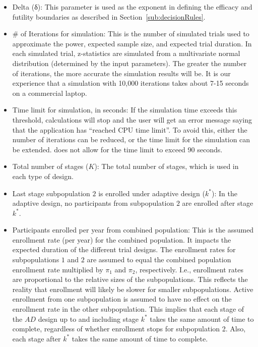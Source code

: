 \documentclass[article]{jss}
\begin{document}
\begin{itemize}

\item Delta (δ): This parameter is used as the exponent in defining the efficacy and futility boundaries as described in Section~\ref{sub:decisionRules}. %

\item \# of Iterations for simulation: This is the number of simulated trials used to 
 approximate the power, expected sample size, and expected trial duration. In each simulated trial,
 z-statistics are simulated from a multivariate normal distribution (determined by the input parameters).
The greater the number of iterations, the more accurate the simulation results will be.
It is our experience that a simulation with 10,000 iterations takes about 7-15 seconds on a commercial laptop.

\item Time limit for simulation, in seconds: If the simulation time exceeds this threshold, calculations will stop and the user will get an error message saying that the application has ``reached CPU time limit''. To avoid this, either the number of iterations can be reduced, or the time limit for the simulation can be extended.  does not allow for the time limit to exceed 90 seconds.

\item Total number of stages ($K$): The total number of stages, which is used in each type of design. 

\item Last stage subpopulation $2$ is enrolled under adaptive design ($k^*$): In the adaptive design, no participants from subpopulation $2$ are enrolled after stage $k^*$. 

\item Participants enrolled per year from combined population: This is the assumed enrollment rate (per year) for the combined population. It impacts the expected duration of the different trial designs. The enrollment rates for  subpopulations $1$ and $2$ are assumed to equal the combined population enrollment rate multiplied by $π_1$ and $π_2$, respectively. I.e., enrollment rates are proportional to the relative sizes of the subpopulations. This reflects the reality that enrollment will likely be slower for smaller subpopulations.
Active enrollment from one subpopulation is assumed to have no effect on the enrollment rate in the other subpopulation. This implies that each stage of the $AD$ design up to and including stage $k^*$ takes the same amount of time to complete, regardless of whether enrollment stops for subpopulation 2. Also, each stage after $k^*$ takes the same amount of time to complete. 


\end{itemize}
\end{document}
